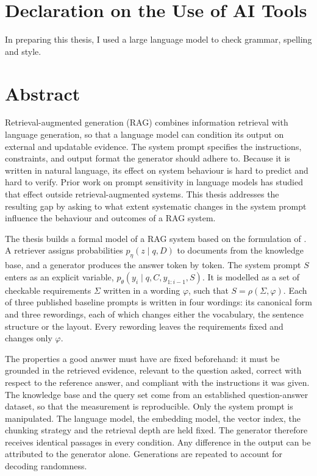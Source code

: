 \documentclass[12pt,a4paper,oneside]{scrreprt}
\begin{document}
\chapter*{Declaration on the Use of AI Tools}
In preparing this thesis, I used a large language model to check grammar, spelling and style.

\chapter*{Abstract}

Retrieval-augmented generation (RAG) combines information retrieval with language generation, so that a language model can condition its output on external and updatable evidence. The system prompt specifies the instructions, constraints, and output
format the generator should adhere to. Because it is written in natural language, its effect on system behaviour is hard to predict and hard to verify. Prior work on prompt sensitivity in language models has studied that effect outside retrieval-augmented systems. This thesis addresses the resulting gap by asking to what extent systematic changes in the system prompt influence the behaviour and outcomes of a RAG system.

The thesis builds a formal model of a RAG system based on the formulation of \citet{lewis2020rag}. A retriever assigns probabilities
$p_\eta(z\mid q,D)$ to documents from the knowledge base, and  a generator produces the answer token by token. The system prompt $S$ enters as an explicit variable, $p_\theta(y_i\mid q,C,y_{1:i-1},S)$. It is modelled as a set of checkable
requirements $\Sigma$ written in a wording $\varphi$, such that $S=\rho(\Sigma,\varphi)$. Each of three published baseline prompts is written in four wordings: its canonical form and three rewordings, each of which changes either the vocabulary, the sentence structure or the layout. Every rewording leaves the requirements fixed and changes only $\varphi$.

The properties a
good answer must have are fixed beforehand: it must be grounded in the retrieved evidence, relevant to the question asked, correct with respect to the reference answer, and compliant with the instructions it was given. The knowledge base and the query set come from an established question-answer
dataset, so that the measurement is reproducible. Only the system prompt is manipulated. The language model, the
embedding model, the vector index, the chunking strategy and the retrieval
depth are held fixed. The generator therefore receives identical passages in every condition. Any difference in the output can be attributed to the generator alone. Generations are repeated to account for decoding
randomness.\\
\end{document}
